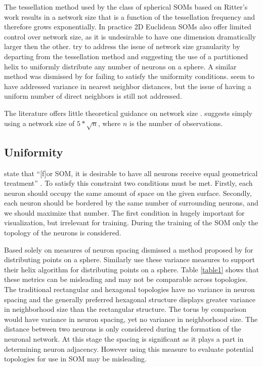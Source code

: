 \documentclass[11pt]{article}
\begin{document}
The tessellation method used by the class of spherical SOMs based on Ritter's
work results in a network size that is a function of the tessellation
frequency and therefore grows exponentially. In practice 2D Euclidean SOMs
also offer limited control over network size, as it is undesirable to have one
dimension dramatically larger then the other.  \cite{Nishio:2006fk} try to
address the issue of network size granularity by departing from the
tessellation method and suggesting the use of a partitioned helix to uniformly
distribute any number of neurons on a sphere.  A similar method was dismissed
by \cite{wu2005} for failing to satisfy the uniformity conditions.
\citeauthor{Nishio:2006fk} seem to have addressed variance in nearest neighbor
distances, but the issue of having a uniform number of direct neighbors is
still not addressed.

The literature offers little theoretical guidance on network size
\citep{cho1996}.  \cite{toolbox} suggests simply using a network size of
\(5*\sqrt {n}\), where \(n\) is the number of observations.

\subsection{Uniformity}
\citeauthor{wu2006} state that ``[f]or SOM, it is desirable to have all neurons
receive equal geometrical treatment'' \cite[pp. 900]{wu2006}.  To satisfy this
constraint two conditions must be met.  Firstly, each neuron should occupy the
same amount of space on the given surface.  Secondly, each neuron should be
bordered by the same number of surrounding neurons, and we should maximize 
that number.  The first condition in hugely important for visualization, but 
irrelevant for training.  During the training of the SOM only the topology of the 
neurons is considered.

Based solely on measures of neuron spacing \cite{wu2005} dismissed a method
proposed by \cite{Rakhmanov94} for distributing points on a sphere.  Similarly
\cite{Nishio:2006fk} use these variance measures to support their helix
algorithm for distributing points on a sphere.  Table \ref{table1} shows that
these metrics can be misleading and may not be comparable across topologies.
The traditional rectangular and hexagonal topologies have no variance in neuron
spacing and the generally preferred hexagonal structure displays greater
variance in neighborhood size than the rectangular structure.  The torus by
comparison would have variance in neuron spacing, yet no variance in
neighborhood size.  The distance between two neurons is only considered during
the formation of the neuronal network.  At this stage the spacing is significant
as it plays a part in determining neuron adjacency. However using this measure
to evaluate potential topologies for use in SOM may be misleading.
\end{document}
